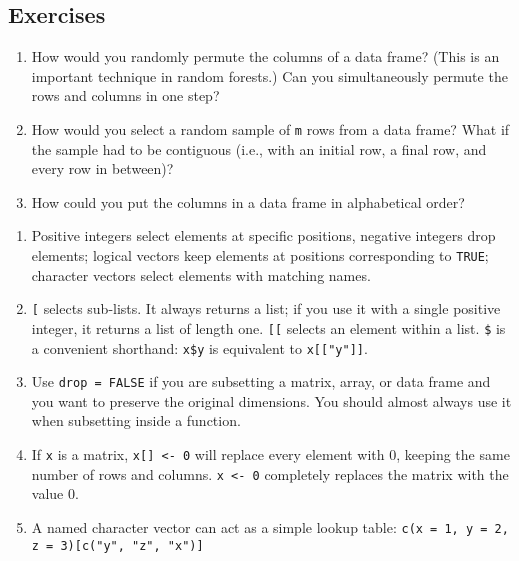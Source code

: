 \subsection{Exercises}

\begin{enumerate}
\def\labelenumi{\arabic{enumi}.}
\item
  How would you randomly permute the columns of a data frame? (This is
  an important technique in random forests.) Can you simultaneously
  permute the rows and columns in one step?
\item
  How would you select a random sample of \texttt{m} rows from a data
  frame? What if the sample had to be contiguous (i.e., with an initial
  row, a final row, and every row in between)?
\item
  How could you put the columns in a data frame in alphabetical order?
\end{enumerate}


\begin{enumerate}
\def\labelenumi{\arabic{enumi}.}
\item
  Positive integers select elements at specific positions, negative
  integers drop elements; logical vectors keep elements at positions
  corresponding to \texttt{TRUE}; character vectors select elements with
  matching names.
\item
  \texttt{{[}} selects sub-lists. It always returns a list; if you use
  it with a single positive integer, it returns a list of length one.
  \texttt{{[}{[}} selects an element within a list. \texttt{\$} is a
  convenient shorthand: \texttt{x\$y} is equivalent to
  \texttt{x{[}{[}"y"{]}{]}}.
\item
  Use \texttt{drop = FALSE} if you are subsetting a matrix, array, or
  data frame and you want to preserve the original dimensions. You
  should almost always use it when subsetting inside a function.
\item
  If \texttt{x} is a matrix, \texttt{x{[}{]} \textless{}- 0} will
  replace every element with 0, keeping the same number of rows and
  columns. \texttt{x \textless{}- 0} completely replaces the matrix with
  the value 0.
\item
  A named character vector can act as a simple lookup table:
  \texttt{c(x = 1, y = 2, z = 3){[}c("y", "z", "x"){]}}
\end{enumerate}
